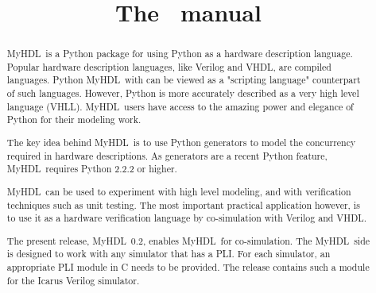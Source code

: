 \documentclass{manual}
\title{The \myhdl\ manual}
\newcommand{\myhdl}{\protect \mbox{MyHDL}}
\begin{document}
\maketitle



\begin{abstract}

\noindent

\myhdl\ is a Python package for using Python as a hardware description
language. Popular hardware description languages, like Verilog and
VHDL, are compiled languages. Python \myhdl\ with can be viewed as a
"scripting language" counterpart of such languages. However, Python is
more accurately described as a very high level language
(VHLL). \myhdl\ users have access to the amazing power and elegance of
Python for their modeling work.

The key idea behind \myhdl\ is to use Python generators to model the
concurrency required in hardware descriptions. As generators are a
recent Python feature, \myhdl\ requires Python 2.2.2 or higher.

\myhdl\ can be used to experiment with high level modeling, and with
verification techniques such as unit testing. The most important
practical application however, is to use it as a hardware verification
language by co-simulation with Verilog and VHDL.

The present release, \myhdl\ 0.2, enables \myhdl\ for
co-simulation. The \myhdl\ side is designed to work with any simulator
that has a PLI. For each simulator, an appropriate PLI module in C
needs to be provided. The release contains such a module for the
Icarus Verilog simulator.


\end{abstract}

\tableofcontents







\end{document}
